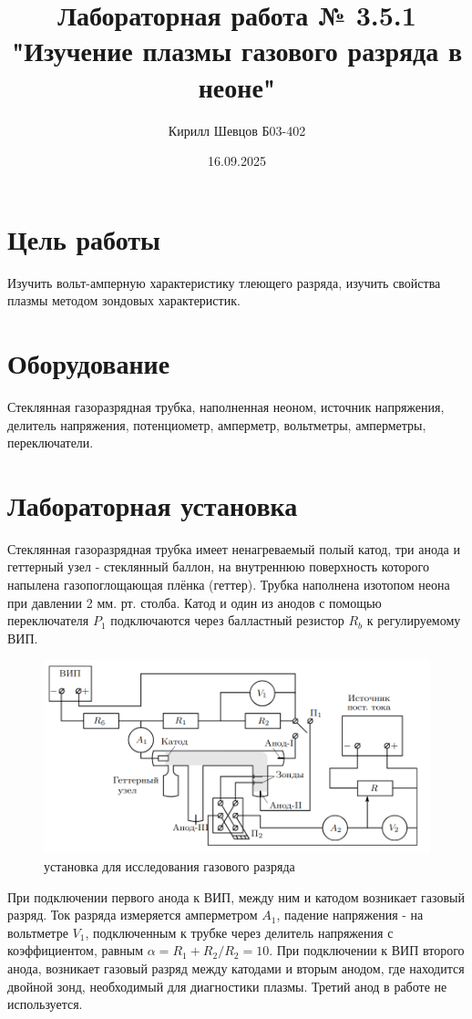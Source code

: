 \documentclass[a4paper, 12pt]{article}
\title{Лабораторная работа № 3.5.1 "Изучение плазмы газового разряда в неоне"}
\author{Кирилл Шевцов Б03-402}
\date{16.09.2025}
\begin{document}
\maketitle
\section*{Цель работы}
Изучить вольт-амперную характеристику тлеющего разряда, изучить свойства плазмы методом зондовых
характеристик.
\section*{Оборудование}
Стеклянная газоразрядная трубка, наполненная неоном, источник напряжения, делитель напряжения, потенциометр,
амперметр, вольтметры, амперметры, переключатели.
\section*{Лабораторная установка}
Стеклянная газоразрядная трубка имеет ненагреваемый полый катод, три анода и геттерный узел - стеклянный баллон,
на внутреннюю поверхность которого напылена газопоглощающая плёнка (геттер). Трубка наполнена изотопом неона при давлении
2 мм. рт. столба. Катод и один из анодов с помощью переключателя $P_{1}$ подключаются через балластный резистор
$R_{b}$ к регулируемому ВИП.
\begin{figure}[htbp]
    \centering
    \includegraphics[width=0.6\linewidth]{p1.png}
    \caption{установка для исследования газового разряда}
    \label{установка для исследования газового разряда}
\end{figure}
При подключении первого анода к ВИП, между ним и катодом возникает газовый разряд. Ток разряда измеряется
амперметром $A_{1}$, падение напряжения - на вольтметре $V_{1}$, подключенным к трубке через делитель напряжения с
коэффициентом, равным $\alpha = {R_{1} + R_{2}}/R_{2} = 10$. При подключении к ВИП второго анода, возникает газовый разряд между
катодами и вторым анодом, где находится двойной зонд, необходимый для диагностики плазмы. Третий анод в работе не используется.
\end{document}
